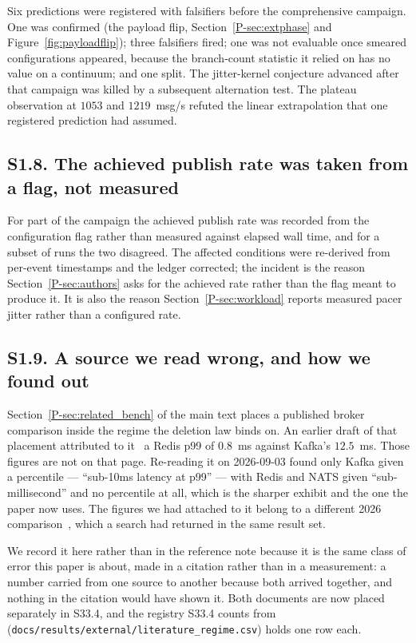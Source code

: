 \documentclass[10pt,journal,onecolumn]{IEEEtran}
\newcommand{\kafka}{Kafka}
\newcommand{\redis}{Redis}
\newcommand{\mainRelatedBench}{\ref{P-sec:related_bench}}   %
\newcommand{\mainPhase}{\ref{P-sec:extphase}}            %
\newcommand{\mainAuthors}{\ref{P-sec:authors}}        %
\newcommand{\mainWorkload}{\ref{P-sec:workload}}          %
\begin{document}
Six predictions were registered with falsifiers before the comprehensive campaign. One was
confirmed (the payload flip, Section~\mainPhase{} and Figure~\ref{fig:payloadflip}); three falsifiers fired;
one was not evaluable once smeared configurations appeared, because the branch-count statistic it
relied on has no value on a continuum; and one split. The jitter-kernel conjecture advanced
after that campaign was killed by a subsequent alternation test. The plateau observation at
$1053$ and $1219$~msg/s refuted the linear extrapolation that one registered prediction had
assumed.

\subsection{S1.8. The achieved publish rate was taken from a flag, not measured}
\label{sec:rateprovenance}

For part of the campaign the achieved publish rate was recorded from the configuration flag
rather than measured against elapsed wall time, and for a subset of runs the two disagreed.
The affected conditions were re-derived from per-event timestamps and the ledger corrected;
the incident is the reason Section~\mainAuthors{} asks for the achieved rate rather than the flag meant to produce it.
It is also the reason Section~\mainWorkload{} reports measured pacer jitter rather than a configured
rate.

\subsection{S1.9. A source we read wrong, and how we found out}

Section~\mainRelatedBench{} of the main text places a published broker comparison inside the regime the
deletion law binds on. An earlier draft of that placement attributed to
it~\cite{indexdev2026brokers} a \redis{} p99 of $0.8$~ms against \kafka{}'s $12.5$~ms.
Those figures are not on that page. Re-reading it on 2026-09-03 found only \kafka{} given a
percentile --- ``sub-10ms latency at p99'' --- with \redis{} and NATS given
``sub-millisecond'' and no percentile at all, which is the sharper exhibit and the one the
paper now uses. The figures we had attached to it belong to a different 2026
comparison~\cite{devto2026streaming}, which a search had returned in the same result set.

We record it here rather than in the reference note because it is the same class of error
this paper is about, made in a citation rather than in a measurement: a number carried from
one source to another because both arrived together, and nothing in the citation would have
shown it. Both documents are now
placed separately in S33.4, and the registry S33.4 counts from
(\texttt{docs/results/external/literature\_regime.csv}) holds one row each.
\end{document}
